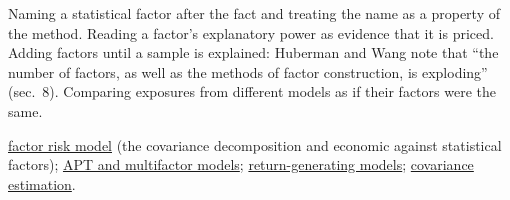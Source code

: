 \begin{qfdefinition}
 Naming a statistical factor after the fact and treating the name as a property of the method. Reading a factor's explanatory power as evidence that it is priced. Adding factors until a sample is explained: Huberman and Wang note that ``the number of factors, as well as the methods of factor construction, is exploding'' (sec.~8). Comparing exposures from different models as if their factors were the same.

 \hyperref[mod:factor-risk-model]{factor risk model} (the covariance decomposition and economic against statistical factors); \hyperref[mod:multifactor-apt]{APT and multifactor models}; \hyperref[mod:return-generating-models]{return-generating models}; \hyperref[meth:portfolio-covariance-estimation]{covariance estimation}.

\end{qfdefinition}
